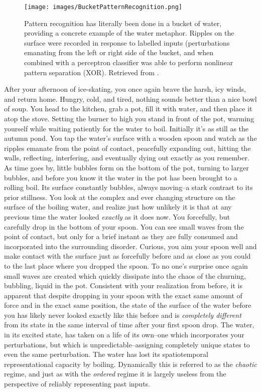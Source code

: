 \begin{figure}[h]
\centering
\texttt{[image: images/BucketPatternRecognition.png]}
\caption[Fernando, Chrisantha and Sojakka, Sampsa.]{Pattern recognition has literally been done in a bucket of water, providing a concrete example of the water metaphor. Ripples on the surface were recorded in response to labelled inputs (perturbations emanating from the left or right side of the bucket, and when combined with a perceptron classifier was able  to perform nonlinear pattern separation (XOR). Retrieved from \cite{fernando2003pattern}. }
\label{F:bucketclassifier}
\end{figure}

After your afternoon of ice-skating, you once again brave the harsh, icy winds, and return home. Hungry, cold, and tired, nothing sounds better than a nice bowl of soup. You head to the kitchen, grab a pot, fill it with water, and then place it atop the stove. Setting the burner to high you stand in front of the pot, warming yourself while waiting patiently for the water to boil. Initially it's as still as the autumn pond. You tap the water's surface with a wooden spoon and watch as the ripples emanate from the point of contact, peacefully expanding out, hitting the walls, reflecting, interfering, and eventually dying out exactly as you remember. As time goes by, little bubbles form on the bottom of the pot, turning to larger bubbles, and before you know it the water in the pot has been brought to a rolling boil. Its surface constantly bubbles, always moving--a stark contrast to its prior stillness. You look at the complex and ever changing structure on the surface of the boiling water, and realize just how unlikely it is that at any previous time the water looked \emph{exactly} as it does now. You forcefully, but carefully drop in the bottom of your spoon. You can see small waves from the point of contact, but only for a brief instant as they are fully consumed and incorporated into the surrounding disorder. Curious, you aim your spoon well and make contact with the surface just as forcefully before and as close as you could to the last place where you dropped the spoon. To no one's surprise once again small waves are created which quickly dissipate into the chaos of the churning, bubbling, liquid in the pot. Consistent with your realization from before, it is apparent that despite dropping in your spoon with the exact same amount of force and in the exact same position, the state of the surface of the water before you has likely never looked exactly like this before and is \emph{completely different} from its state in the same interval of time after your first spoon drop. The water, in its excited state, has taken on a life of its own--one which incorporates your perturbations, but which is unpredictable--assigning completely unique states to even the same perturbation. The water has lost its spatiotemporal representational capacity by boiling. Dynamically this is referred to as the \emph{chaotic} regime, and just as with the \emph{ordered} regime it is largely useless from the perspective of reliably representing past inputs.

